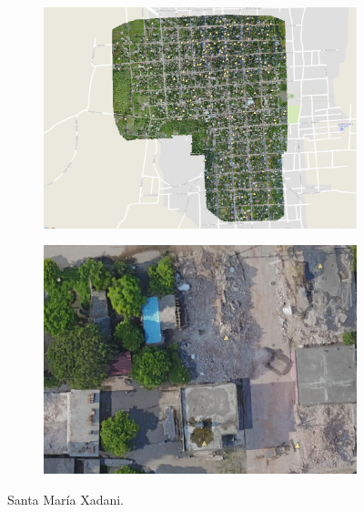 \begin{figure}[!h]
  \centering
    \begin{subfigure}{.9\textwidth}
        \includegraphics[width=\textwidth]{images/santamaria-ortho.jpg}
    \end{subfigure}
    \begin{subfigure}{.9\textwidth}
        \includegraphics[width=\textwidth]{images/santamaria-example.jpg}
    \end{subfigure}
  \caption{Santa Mar\'ia Xadani.}
  \label{fig:santamaria}
\end{figure}

